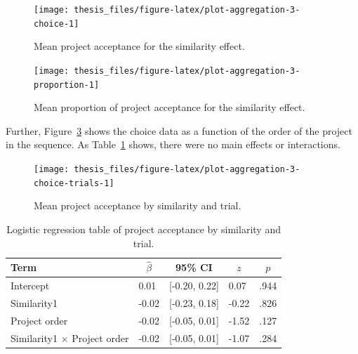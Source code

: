 \documentclass[a4paper, nobind, dvipsnames]{templates/ociamthesis}
\theoremstyle{definition}
\theoremstyle{definition}
\theoremstyle{definition}
\theoremstyle{definition}
\theoremstyle{remark}
\begin{document}
\begin{figure}
\texttt{[image: thesis\_files/figure-latex/plot-aggregation-3-choice-1]} \caption{Mean project acceptance for the similarity effect.}\label{fig:plot-aggregation-3-choice}
\end{figure}



\begin{figure}
\texttt{[image: thesis\_files/figure-latex/plot-aggregation-3-proportion-1]} \caption{Mean proportion of project acceptance for the similarity effect.}\label{fig:plot-aggregation-3-proportion}
\end{figure}

Further, Figure~\ref{fig:plot-aggregation-3-choice-trials} shows the choice
data as a function of the order of the project in the sequence. As
Table~\ref{tab:similarity-project-order} shows, there were no main effects or
interactions.



\begin{figure}
\texttt{[image: thesis\_files/figure-latex/plot-aggregation-3-choice-trials-1]} \caption{Mean project acceptance by similarity and trial.}\label{fig:plot-aggregation-3-choice-trials}
\end{figure}

\begin{table}[tbp]

\begin{center}
\begin{threeparttable}

\caption{\label{tab:similarity-project-order}Logistic regression table of project acceptance by similarity and trial.}

\begin{tabular}{lllll}
\toprule
Term & \multicolumn{1}{c}{$\hat{\beta}$} & \multicolumn{1}{c}{95\% CI} & \multicolumn{1}{c}{$z$} & \multicolumn{1}{c}{$p$}\\
\midrule
Intercept & 0.01 & {}[-0.20, 0.22] & 0.07 & .944\\
Similarity1 & -0.02 & {}[-0.23, 0.18] & -0.22 & .826\\
Project order & -0.02 & {}[-0.05, 0.01] & -1.52 & .127\\
Similarity1 $\times$ Project order & -0.02 & {}[-0.05, 0.01] & -1.07 & .284\\
\bottomrule
\end{tabular}

\end{threeparttable}
\end{center}

\end{table}
\end{document}
